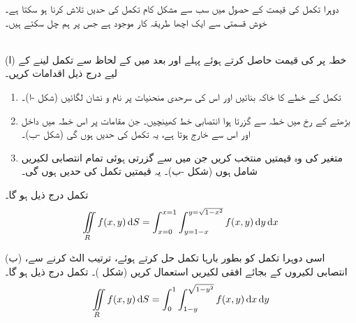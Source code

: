 دوہرا تکمل کی قیمت کے حصول میں سب سے مشکل کام تکمل کی  حدیں  تلاش کرنا ہو سکتا ہے۔ خوش قسمتی سے   ایک  اچھا  طریقہ کار موجود ہے جس پر ہم چل سکتے ہیں۔ 

\\
(ا) \quad
   خطہ  پر  کی قیمت حاصل کرتے ہوئے  پہلے  اور بعد میں  کے لحاظ سے تکمل لینے کے لیے درج ذیل اقدامات کریں۔
\begin{enumerate}[1.]
\item
{}\quad
تکمل کے   خطے  کا خاکہ بنائیں اور اس کی سرحدی منحنیات   پر نام و نشان لگائیں (شکل -ا)۔
\item
{}\quad
بڑھتے  کے  رخ  میں خطہ  سے گزرتا ہوا انتصابی  خط  کھینچیں۔ جن مقامات  پر   اس خطہ میں داخل   اور اس سے     خارج ہوتا ہے، یہ تکمل کی   حدیں  ہوں گی (شکل -ب)۔
\item
 \quad
متغیر    کی وہ قیمتیں  منتخب کریں جن میں  سے گزرتی ہوئی تمام انتصابی  لکیریں شامل ہوں (شکل -ب)۔ یہ قیمتیں تکمل کی  حدیں ہوں گی۔
\end{enumerate}
 تکمل درج ذیل ہو گا۔
\begin{align*}
\iint\limits_R f(x,y)\dif S=\int_{x=0}^{x=1}\int_{y=1-x}^{y=\sqrt{1-x^2}}f(x,y)\dif y\dif x
\end{align*}

(ب) \quad 
اسی دوہرا تکمل کو   بطور  بارہا تکمل حل کرتے ہوئے، ترتیب الٹ کرنے سے، انتصابی لکیروں کے بجائے  افقی لکیریں استعمال کریں (شکل )۔ تکمل درج ذیل ہو گا۔
\begin{align*}
\iint\limits_R f(x,y)\dif S=\int_0^1\int_{1-y}^{\sqrt{1-y^2}}f(x,y)\dif x\dif y
\end{align*} 

